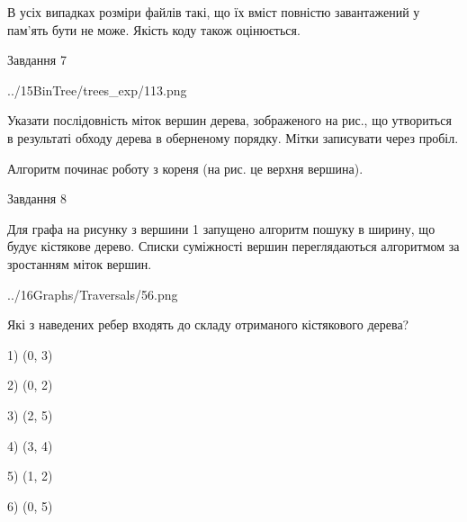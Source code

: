 \documentclass[12pt, ukrainian]{article}
\begin{document}
{В усіх випадках розміри файлів такі, що їх вміст повністю завантажений у пам'ять бути не може. Якість коду також оцінюється.



\vspace{10mm}\par

\newpage
\begin{minipage}[t]{9.7cm}
               
{\begin{center}Завдання {7}\end{center}}
\vspace{-4mm}

\begin{center}
	{../15BinTree/trees_exp/113.png}
\end{center}
Указати послідовність міток вершин дерева, зображеного на рис., що утвориться в результаті обходу дерева в оберненому порядку. Мітки записувати через пробіл.\par Алгоритм починає роботу з кореня (на рис. це верхня вершина).\par

\end{minipage}
\vline \hspace{8mm}
\begin{minipage}[t]{8.0cm}
               
{\begin{center}Завдання {8}\end{center}}
\vspace{-4mm}
Для графа на рисунку з вершини 1 запущено алгоритм пошуку в ширину, що будує кістякове дерево. Списки суміжності вершин переглядаються алгоритмом за зростанням міток вершин.\par
\begin{center}
	{../16Graphs/Traversals/56.png}
\end{center}
\par Які з наведених ребер входять до складу отриманого кістякового дерева?\par
1) (0, 3)\par
2) (0, 2)\par
3) (2, 5)\par
4) (3, 4)\par
5) (1, 2)\par
6) (0, 5)\par
{\vskip 15pt} \par


\end{minipage}}
\end{document}
